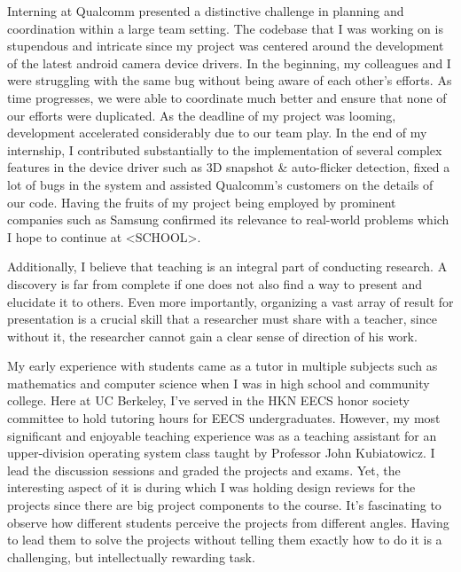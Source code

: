 \documentclass[12pt]{article}
\begin{document}
Interning at Qualcomm presented a distinctive challenge in planning and coordination within a large team setting. The codebase that I was working on is stupendous and intricate since my project was centered around the development of the latest android camera device drivers. In the beginning, my colleagues and I were struggling with the same bug without being aware of each other's efforts. As time progresses, we were able to coordinate much better and ensure that none of our efforts were duplicated. As the deadline of my project was looming, development accelerated considerably due to our team play. In the end of my internship, I contributed substantially to the implementation of several complex features in the device driver such as 3D snapshot \& auto-flicker detection, fixed a lot of bugs in the system and assisted Qualcomm's customers on the details of our code. Having the fruits of my project being employed by prominent companies such as Samsung confirmed its relevance to real-world problems which I hope to continue at <SCHOOL>. \newline

    Additionally, I believe that teaching is an integral part of conducting research. A discovery is far from complete if one does not also find a way to present and elucidate it to others. Even more importantly, organizing a vast array of result for presentation is a crucial skill that a researcher must share with a teacher, since without it, the researcher cannot gain a clear sense of direction of his work. \newline

    My early experience with students came as a tutor in multiple subjects such as mathematics and computer science when I was in high school and community college. Here at UC Berkeley, I've served in the HKN EECS honor society committee to hold tutoring hours for EECS undergraduates. However, my most significant and enjoyable teaching experience was as a teaching assistant for an upper-division operating system class taught by Professor John Kubiatowicz. I lead the discussion sessions and graded the projects and exams. Yet, the interesting aspect of it is during which I was holding design reviews for the projects since there are big project components to the course. It's fascinating to observe how different students perceive the projects from different angles. Having to lead them to solve the projects without telling them exactly how to do it is a challenging, but intellectually rewarding task. \newline
\end{document}
